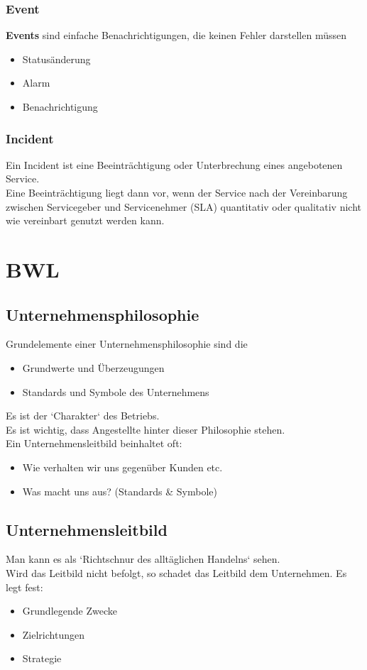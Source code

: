 \documentclass[10pt]{article}
\begin{document}
\subsubsection{Event}
\textbf{Events} sind einfache Benachrichtigungen, die keinen Fehler darstellen müssen \\
\begin{itemize}
\item Statusänderung 
\item Alarm 
\item Benachrichtigung
\end{itemize}

\subsubsection{Incident}
Ein Incident ist eine Beeinträchtigung oder Unterbrechung eines angebotenen Service. \\
Eine Beeinträchtigung liegt dann vor, wenn der Service nach der Vereinbarung zwischen Servicegeber und Servicenehmer (SLA) quantitativ oder qualitativ nicht wie vereinbart genutzt werden kann.

\section{BWL}
\subsection{Unternehmensphilosophie}
Grundelemente einer Unternehmensphilosophie sind die 
\begin{itemize}
\item Grundwerte und Überzeugungen 
\item Standards und Symbole des  Unternehmens
\end{itemize}
Es ist der `Charakter` des  Betriebs. \\
Es ist  wichtig, dass Angestellte hinter dieser Philosophie stehen. \\
Ein Unternehmensleitbild beinhaltet oft:
\begin{itemize}
\item Wie verhalten wir uns gegenüber Kunden etc.
\item Was macht uns aus? (Standards \& Symbole)
\end{itemize}

\subsection{Unternehmensleitbild} 
Man kann es als `Richtschnur des alltäglichen Handelns` sehen. \\
Wird das Leitbild nicht befolgt, so schadet das Leitbild dem Unternehmen.
Es legt fest:
\begin{itemize}
\item Grundlegende Zwecke
\item Zielrichtungen
\item Strategie
\end{itemize}
\end{document}

